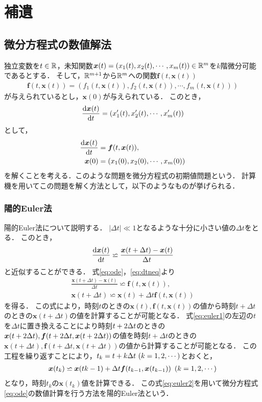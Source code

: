 \chapter{補遺}
\label{chap:補遺}
\section{微分方程式の数値解法}
独立変数を$t \in \mathbb{R}$，未知関数$\bm{x}(t) = \left(x_1(t),x_2(t),\cdots,x_m(t)\right) \in \mathbb{R}^m$を$k$階微分可能であるとする．
そして，$\mathbb{R}^{m+1}$から$\mathbb{R}^m$への関数$\bm{f}(t,\bm{x}(t))$
\begin{align*}
    \bm{f}(t,\bm{x}(t)) = \left(f_1(t,\bm{x}(t)),f_2(t,\bm{x}(t)),\cdots,f_m(t,\bm{x}(t))\right)
\end{align*}
が与えられているとし，$\bm{x}(0)$が与えられている．
このとき，
\begin{align*}
    \frac{\mathrm{d}\bm{x}(t)}{\mathrm{d}t} = \left(x_1^{\prime}(t),x_2^{\prime}(t),\cdots,x_m^{\prime}(t)\right)
\end{align*}
として，
\begin{align}
    \frac{\mathrm{d}\bm{x}(t)}{\mathrm{d}t} &= \bm{f}(t,\bm{x}(t)), \label{eq:ode} \\
    \bm{x}(0) &= \left(x_1(0),x_2(0),\cdots,x_m(0)\right)
\end{align}
を解くことを考える．このような問題を微分方程式の初期値問題という．
計算機を用いてこの問題を解く方法として，以下のようなものが挙げられる．
\subsection{陽的Euler法}
陽的Euler法について説明する．
$|\Delta t| \ll 1 $となるような十分に小さい値の$\Delta t$をとる．
このとき，
\begin{align}
    \label{eq:dtneq}
    \frac{\mathrm{d}\bm{x}(t)}{\mathrm{d}t} \backsimeq \frac{\bm{x}(t+\Delta t) - \bm{x}(t)}{\Delta t}
\end{align}
と近似することができる．
式\eqref{eq:ode}，\eqref{eq:dtneq}より
\begin{align}
    \frac{\bm{x}(t + \Delta t) - \bm{x}(t)}{\Delta t} \backsimeq \bm{f}(t,\bm{x}(t)),\\
    \bm{x}(t + \Delta t) \backsimeq \bm{x}(t) + \Delta t \bm{f}(t,\bm{x}(t)) \label{eq:euler1}
\end{align}
を得る．
この式により，時刻$t$のときの$\bm{x}(t),\bm{f}(t,\bm{x}(t))$の値から時刻$t+\Delta t$のときの$\bm{x}(t+\Delta t)$の値を計算することが可能となる．
式\eqref{eq:euler1}の左辺の$t$を$\Delta t$に置き換えることにより時刻$t + 2\Delta t$のときの$\bm{x}(t+2\Delta t),\bm{f}(t+2\Delta t,\bm{x}(t+2\Delta t))$の値を時刻$t+\Delta t$のときの$\bm{x}(t+\Delta t),\bm{f}(t+\Delta t,\bm{x}(t+\Delta t))$の値から計算することが可能となる．
この工程を繰り返すことにより，$t_k = t + k\Delta t \ (k = 1,2,\cdots)$とおくと，
\begin{align}
    \bm{x}(t_k) \backsimeq \bm{x}(t{k-1}) + \Delta t\bm{f}(t_{k-1},\bm{x}(t_{k-1})) \ \left(k = 1,2,\cdots\right) \label{eq:euler2}
\end{align}
となり，時刻$t_k$の$\bm{x}(t_k)$値を計算できる．
この式\eqref{eq:euler2}を用いて微分方程式\eqref{eq:ode}の数値計算を行う方法を陽的Euler法という．

